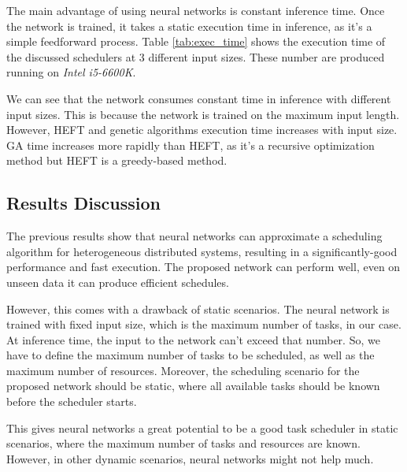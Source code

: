 The main advantage of using neural networks is constant inference time. Once the network is trained, it takes a static execution time in inference, as it's a simple feedforward process. Table \ref{tab:exec_time} shows the execution time of the discussed schedulers at 3 different input sizes. These number are produced running on \emph{Intel i5-6600K}. 

We can see that the network consumes constant time in inference with different input sizes. This is because the network is trained on the maximum input length. However, HEFT and genetic algorithms execution time increases with input size. GA time increases more rapidly than HEFT, as it's a recursive optimization method but HEFT is a greedy-based method.

\subsection{Results Discussion}
The previous results show that neural networks can approximate a scheduling algorithm for heterogeneous distributed systems, resulting in a significantly-good performance and fast execution. The proposed network can perform well, even on unseen data it can produce efficient schedules.

However, this comes with a drawback of static scenarios. The neural network is trained with fixed input size, which is the maximum number of tasks, in our case. At inference time, the input to the network can't exceed that number. So, we have to define the maximum number of tasks to be scheduled, as well as the maximum number of resources. Moreover, the scheduling scenario for the proposed network should be static, where all available tasks should be known before the scheduler starts. 

This gives neural networks a great potential to be a good task scheduler in static scenarios, where the maximum number of tasks and resources are known. However, in other dynamic scenarios, neural networks might not help much. 